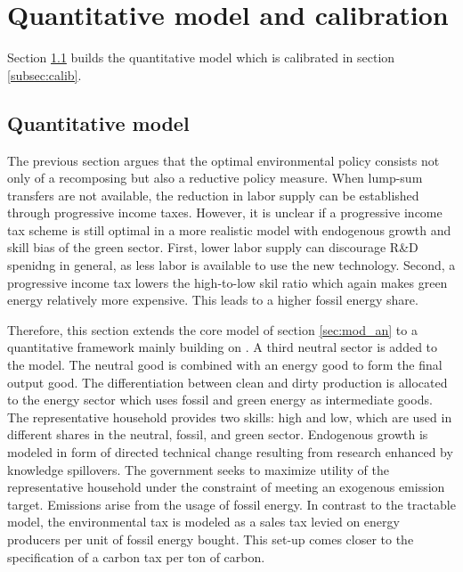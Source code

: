 \section{Quantitative model and calibration}\label{sec:model}

Section \ref{subsec:quantmod} builds the quantitative model which is calibrated in section \ref{subsec:calib}.

\subsection{Quantitative model}\label{subsec:quantmod}
The previous section argues that the optimal environmental policy consists not only of a recomposing but also a reductive policy measure. When lump-sum transfers are not available, the reduction in labor supply can be established through progressive income taxes. 
 However, it is unclear if a progressive income tax scheme is still optimal in a more realistic model with endogenous growth and skill bias of the green sector. First, lower labor supply can discourage R\&D spenidng in general, as less labor is available to use the new technology. Second, a progressive income tax lowers the high-to-low skil ratio which again makes green energy relatively more expensive. This leads to a higher fossil energy share.%
 
Therefore, this section extends the core model of section \ref{sec:mod_an} to a quantitative framework mainly building on \cite{Fried2018ClimateAnalysis}.
A third neutral sector is added to the model. The neutral good is combined with an energy good to form  the final output good. The differentiation between clean and dirty production is allocated to the energy sector which uses fossil and green energy as intermediate goods.
The representative household provides two skills: high and low, which are used in different shares in the neutral, fossil, and green sector. 
Endogenous growth is modeled in form of directed technical change resulting from research enhanced by knowledge spillovers. The government seeks to maximize utility of the representative household under the constraint of meeting an exogenous emission target. Emissions arise from the usage of fossil energy. In contrast to the tractable model, the environmental tax is modeled as a sales tax  levied on energy producers per unit of fossil energy bought. This set-up comes closer to the specification of a carbon tax per ton of carbon. 

